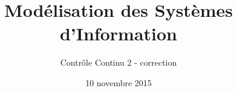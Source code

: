 \title{
   Modélisation des Systèmes d'Information
}
\author{
	Contrôle Continu 2 - correction
}
\date{10 novembre 2015}
